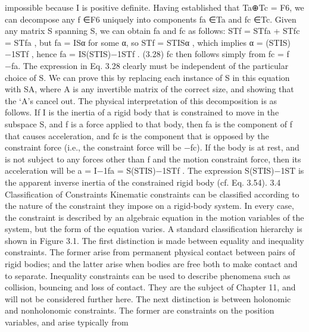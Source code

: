 impossible because I is positive definite. Having established that Ta⊕Tc = F6, we can decompose any f ∈F6 uniquely into components fa ∈Ta and fc ∈Tc. Given any matrix S spanning S, we can obtain fa and fc as follows: STf = STfa + STfc = STfa , but fa = ISα for some α, so STf = STISα , which implies α = (STIS)−1STf , hence fa = IS(STIS)−1STf . (3.28) fc then follows simply from fc = f −fa. The expression in Eq. 3.28 clearly must be independent of the particular choice of S. We can prove this by replacing each instance of S in this equation with SA, where A is any invertible matrix of the correct size, and showing that the ‘A’s cancel out. The physical interpretation of this decomposition is as follows. If I is the inertia of a rigid body that is constrained to move in the subspace S, and f is a force applied to that body, then fa is the component of f that causes acceleration, and fc is the component that is opposed by the constraint force (i.e., the constraint force will be −fc). If the body is at rest, and is not subject to any forces other than f and the motion constraint force, then its acceleration will be a = I−1fa = S(STIS)−1STf . The expression S(STIS)−1ST is the apparent inverse inertia of the constrained rigid body (cf. Eq. 3.54). 3.4 Classification of Constraints Kinematic constraints can be classified according to the nature of the constraint they impose on a rigid-body system. In every case, the constraint is described by an algebraic equation in the motion variables of the system, but the form of the equation varies. A standard classification hierarchy is shown in Figure 3.1. The first distinction is made between equality and inequality constraints. The former arise from permanent physical contact between pairs of rigid bodies; and the latter arise when bodies are free both to make contact and to separate. Inequality constraints can be used to describe phenomena such as collision, bouncing and loss of contact. They are the subject of Chapter 11, and will not be considered further here. The next distinction is between holonomic and nonholonomic constraints. The former are constraints on the position variables, and arise typically from

